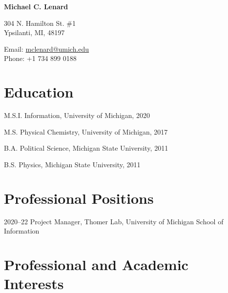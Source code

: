 \documentclass[12pt,letterpaper]{report}
\newcommand{\myname}{Michael C. Lenard}
\newcommand{\namefont}[1]{{\normalfont\bfseries\Huge{#1}}}
\begin{document}
 \raggedright

\namefont{\myname}

\vspace{1em}
\begin{minipage}[t]{0.68\textwidth}
        304 N. Hamilton St. \#1 \\
Ypsilanti, MI, 48197
\end{minipage}
\begin{minipage}[t]{0.31\textwidth}
        Email: \href{mailto:mclenard@umich.edu}{mclenard@umich.edu} \\
        Phone: +1 734 899 0188
\end{minipage}
\vspace{0.5em}



\section*{Education}

\begin{tablist}

	\item[M.S.I.] \tab Information, University of Michigan, 2020

	\item[M.S.]  \tab Physical Chemistry, University of Michigan, 2017

	\item[B.A.]  \tab Political Science, Michigan State University, 2011
        
	\item[B.S.]  \tab Physics, Michigan State University, 2011

\end{tablist}



\section*{Professional Positions}

\begin{tablist}

\item[2020--22] \tab Project Manager, Thomer Lab, University of Michigan School of Information

\end{tablist}



\section*{Professional and Academic Interests}
\end{document}
